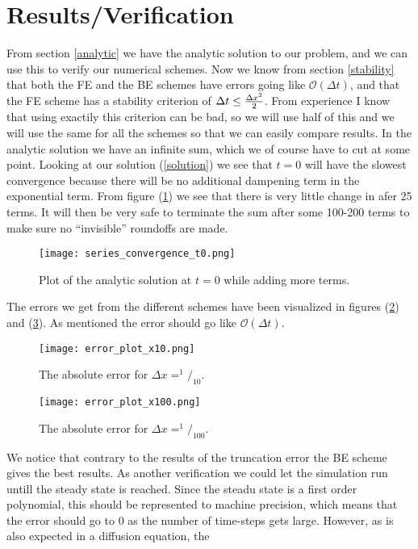 \documentclass[a4paper,english, 10pt, twoside]{article}
\begin{document}
\section{Results/Verification}
From section \ref{analytic} we have the analytic solution to our problem, and we can use this to verify our numerical schemes. Now we know from 
section \ref{stability} that both the FE and the BE schemes have errors going like $\mathcal{O}(\Delta t)$, and that the FE scheme has a stability 
criterion of $\Delta t\leq {\Delta x^2 \over 2}$. From experience I know that using exactily this criterion can be bad, so we will use half of this 
and we will use the same for all the schemes so that we can easily compare results. In the analytic solution we have an infinite sum, which we of 
course have to cut at some point. Looking at our solution (\ref{solution}) we see that $t=0$ will have the slowest convergence because there will be 
no additional dampening term in the exponential term. From figure (\ref{convergence_analytic}) we see that there is very little change in afer 25 
terms. It will then be very safe to terminate the sum after some 100-200 terms to make sure no ``invisible'' roundoffs are made.
\begin{figure}[H]
 \centering
 \texttt{[image: series\_convergence\_t0.png]}
 \caption{Plot of the analytic solution at $t=0$ while adding more terms. }
 \label{convergence_analytic}
\end{figure}
The errors we get from the different schemes have been visualized in figures (\ref{errors_nx10}) and (\ref{errors_nx100}). As mentioned the error 
should go like $\mathcal{O}(\Delta t)$. 
\begin{figure}[H]
 \centering
 \texttt{[image: error\_plot\_x10.png]}
 \caption{The absolute error for $\Delta x = ^1/_{10}$. }
 \label{errors_nx10}
\end{figure}
\begin{figure}[H]
 \centering
 \texttt{[image: error\_plot\_x100.png]}
 \caption{The absolute error for $\Delta x = ^1/_{100}$. }
 \label{errors_nx100}
\end{figure}
We notice that contrary to the results of the truncation error the BE scheme gives the best results. As another verification we could let the 
simulation run untill the steady state is reached. Since the steadu state is a first order polynomial, this should be represented to machine precision, 
which means that the error should go to 0 as the number of time-steps gets large. However, as is also expected in a diffusion equation, the 
\end{document}
